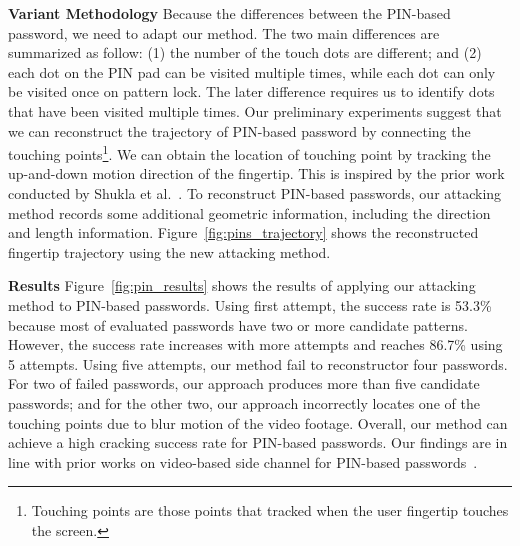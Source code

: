         \vspace{1.5mm}
        \noindent \textbf{Variant Methodology} Because the differences
        between the PIN-based password, we need to adapt our method. The two
        main differences are summarized as follow: (1) the number of the
        touch dots are different; and (2) each dot on the PIN pad can be
        visited multiple times, while each dot can only be visited once on
        pattern lock. The later difference requires us to identify dots that
        have been visited multiple times.  Our preliminary experiments
        suggest that we can reconstruct the trajectory of PIN-based password
        by connecting the touching points\footnote{Touching points are those
        points that tracked when the user fingertip touches the screen.}. We
        can obtain the location of touching point by tracking the up-and-down
        motion direction of the fingertip. This is inspired by the prior work
        conducted by Shukla {et al.}~\cite{shukla2014beware}. To reconstruct
        PIN-based passwords, our attacking method records some additional
        geometric information, including the direction and length
        information. Figure~\ref{fig:pins_trajectory} shows the reconstructed
        fingertip trajectory using the new attacking method.

        \vspace{1.5mm}
        \noindent \textbf{Results} Figure~\ref{fig:pin_results} shows the
        results of applying our attacking method to PIN-based passwords.
        Using first attempt, the success rate is  53.3\% because most of
        evaluated passwords have two or more candidate patterns. However, the
        success rate increases with more attempts and reaches 86.7\% using 5
        attempts. Using five attempts, our method fail to reconstructor four
        passwords. For two of failed passwords, our approach produces more
        than five candidate passwords; and for the other two, our approach
        incorrectly locates one of the touching points due to  blur
        motion of the video footage. Overall, our method can achieve a high
        cracking success rate for PIN-based passwords. Our findings are in
        line with prior works on video-based side channel for PIN-based
        passwords~\cite{shukla2014beware}.

%



